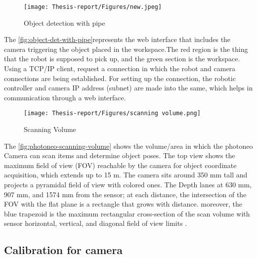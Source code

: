 \documentclass[12pt]{article}
\begin{document}
\begin{figure}[h]
    \centering
    \texttt{[image: Thesis-report/Figures/new.jpeg]}
    \caption{Object detection with pipe }
    \label{fig:object-det-with-pipe}
\end{figure}

 The \autoref{fig:object-det-with-pipe}represents the web interface that includes the camera triggering the object placed in the workspace.The red region is the thing that the robot is supposed to pick up, and the green section is the workspace. Using a TCP/IP client, request a connection in which the robot and camera connections are being established. For setting up the connection, the robotic controller and camera IP address (subnet) are made into the same, which helps in communication through a web interface.
 
\begin{figure}[h]
  \centering
  \texttt{[image: Thesis-report/Figures/scanning volume.png]}
  \caption{Scanning Volume \cite{ref18}}
  \label{fig:photoneo-scanning-volume}
\end{figure}

The \autoref{fig:photoneo-scanning-volume} shows the volume/area in which the photoneo Camera can scan items and determine object poses. The top view shows the maximum field of view (FOV) reachable by the camera for object coordinate acquisition, which extends up to 15 m. The camera sits around 350 mm tall and projects a pyramidal field of view with colored ones. The Depth lanes at 630 mm, 907 mm, and 1574 mm from the sensor; at each distance, the intersection of the FOV with the flat plane is a rectangle that grows with distance. moreover, the blue trapezoid is the maximum rectangular cross-section of the scan volume with sensor horizontal, vertical, and diagonal field of view limits \cite{ref2}.


\subsection{Calibration for camera}
\end{document}
